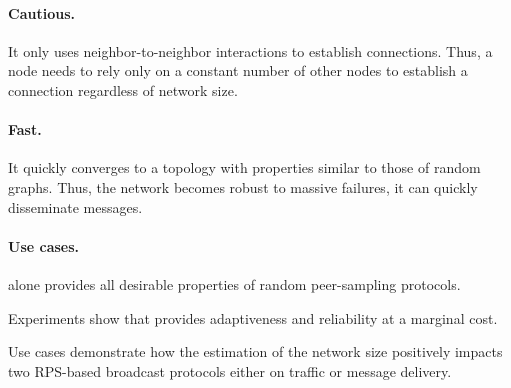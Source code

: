 \paragraph{Cautious.}
It only uses neighbor-to-neighbor interactions to establish connections. Thus, a
node needs to rely only on a constant number of other nodes to establish a
connection regardless of network size.

\paragraph{Fast.}
It quickly converges to a topology with properties similar to those of random
graphs. Thus, the network becomes robust to massive failures, it can quickly
disseminate messages.



\paragraph{Use cases.} \SPRAY alone provides all desirable properties of random
peer-sampling protocols. 

\begin{inparaenum}[(i)]
\item Experiments show that \SPRAY provides adaptiveness and reliability at a
  marginal cost.
\item Use cases demonstrate how the estimation of the network size positively
  impacts two RPS-based broadcast protocols either on traffic or message
  delivery.
\end{inparaenum}







